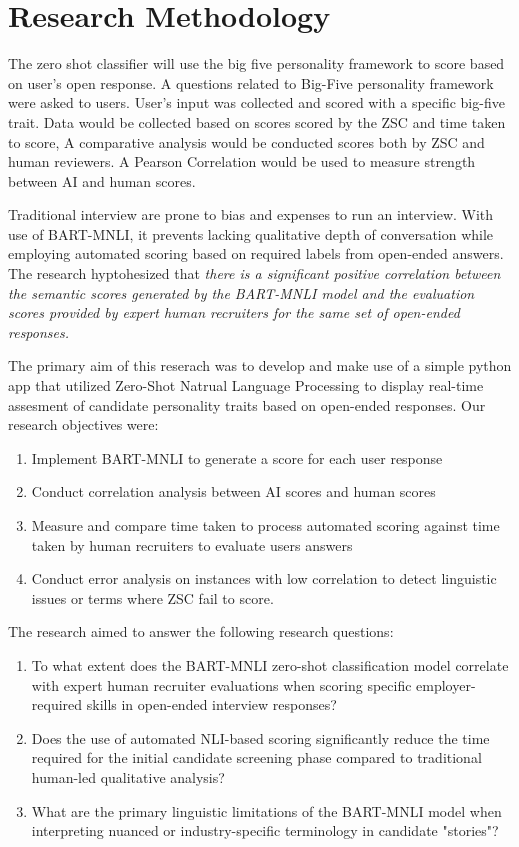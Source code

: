 \section{Research Methodology}
\label{sec:Res}

\par The zero shot classifier will use the big five personality framework to score based on user's open response. A questions related to Big-Five personality framework were asked to users. User's input was collected and scored with a specific big-five trait. Data would be collected based on scores scored by the ZSC and time taken to score, A comparative analysis would be conducted scores both by ZSC and human reviewers. A Pearson Correlation would be used to measure strength between AI and human scores.  

\par Traditional interview are prone to bias and expenses to run an interview. With use of BART-MNLI, it prevents lacking qualitative depth of conversation while employing automated scoring based on required labels from open-ended answers. The research hyptohesized that \textit{there is a significant positive correlation between the semantic scores generated by the BART-MNLI model and the evaluation scores provided by expert human recruiters for the same set of open-ended responses.}

\par The primary aim of this reserach was to develop and make use of a simple python app that utilized Zero-Shot Natrual Language Processing to display real-time assesment of candidate personality traits based on open-ended responses.  Our research objectives were:
\begin{enumerate}
    \item Implement BART-MNLI to generate a score for each user response
    \item Conduct correlation analysis between AI scores and human scores
    \item Measure and compare time taken to process automated scoring against time taken by human recruiters to evaluate users answers
    \item Conduct error analysis on instances with low correlation to detect linguistic issues or terms where ZSC fail to score.
\end{enumerate}

\par The research aimed to answer the following research questions:
\begin{enumerate}
    \item To what extent does the BART-MNLI zero-shot classification model correlate with expert human recruiter evaluations when scoring specific employer-required skills in open-ended interview responses?
    \item Does the use of automated NLI-based scoring significantly reduce the time required for the initial candidate screening phase compared to traditional human-led qualitative analysis?
    \item What are the primary linguistic limitations of the BART-MNLI model when interpreting nuanced or industry-specific terminology in candidate "stories"?
\end{enumerate}

